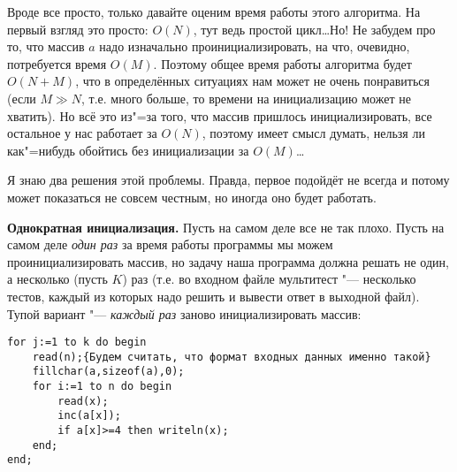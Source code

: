 Вроде все просто, только давайте оценим время работы этого алгоритма. На первый взгляд это просто: 
$O(N)$, тут ведь простой цикл\dots Но! Не забудем про то, что массив $a$ надо изначально 
проинициализировать, на что, очевидно, потребуется время $O(M)$. Поэтому общее время работы 
алгоритма будет $O(N+M)$, что в определённых ситуациях нам может не очень понравиться (если $M\gg 
N$, т.е. много больше, то времени на инициализацию может не хватить). Но всё это из"=за 
того, что массив пришлось инициализировать, все остальное у нас работает за $O(N)$, поэтому имеет 
смысл думать, нельзя ли как"=нибудь обойтись без инициализации за $O(M)$\dots


Я знаю два решения этой проблемы. Правда, первое подойдёт не всегда и потому может показаться не 
совсем честным, но иногда оно будет работать.

\textbf{Однократная инициализация.} Пусть на самом деле все не так плохо. Пусть на самом деле 
\textit{один раз} за время работы программы мы можем проинициализировать массив, но задачу наша 
программа должна решать не один, а несколько (пусть $K$) раз (т.е. во входном файле мультитест "--- несколько тестов, каждый из которых надо решить и вывести ответ в выходной файл). Тупой вариант "--- \textit{каждый раз} 
заново инициализировать массив:
\begin{codesampleo}\begin{verbatim}
for j:=1 to k do begin
    read(n);{Будем считать, что формат входных данных именно такой}
    fillchar(a,sizeof(a),0);
    for i:=1 to n do begin
        read(x);
        inc(a[x]);
        if a[x]>=4 then writeln(x);
    end;
end;
\end{verbatim}
\end{codesampleo}


